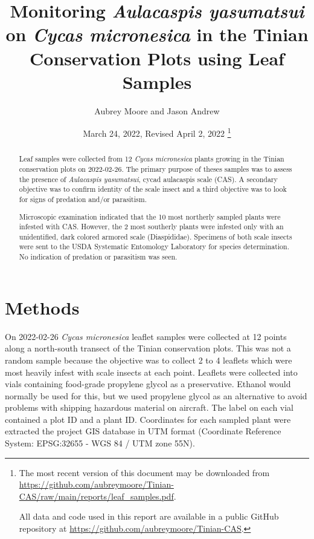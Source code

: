 \documentclass[12pt,letterpaper,english,bibliography=totocnumbered, abstract=on]{scrartcl}
\begin{document}
\titlehead{Technical Report}

\title{Monitoring \textit{Aulacaspis yasumatsui} on \textit{Cycas micronesica} in the Tinian Conservation Plots using Leaf Samples}

\author{Aubrey Moore and Jason Andrew}

\date{
	March 24, 2022, Revised April 2, 2022
	\footnote{
		The most recent version of this document may be downloaded from \url{https://github.com/aubreymoore/Tinian-CAS/raw/main/reports/leaf_samples.pdf}.
		
		All data and code used in this report are available in a public GitHub repository at
		\url{https://github.com/aubreymoore/Tinian-CAS}.
	}
}

\maketitle


\begin{abstract}
Leaf samples were collected from 12 \textit{Cycas micronesica} plants growing in the Tinian conservation plots on 2022-02-26.
The primary purpose of theses samples was to assess the presence of \textit{Aulacaspis yasumatsui}, cycad aulacaspis scale (CAS). A secondary objective was to confirm identity of the scale insect and a third objective was to look for signs of predation and/or parasitism. 

Microscopic examination indicated that the 10 most northerly sampled plants were infested with CAS. However, the 2 most southerly plants were infested only with an unidentified, dark colored armored scale (Diaspididae). Specimens of both scale insects were sent to the USDA Systematic Entomology Laboratory for species determination. No indication of predation or parasitism was seen.  
\end{abstract}



\clearpage
\tableofcontents

\clearpage
\section{Methods}

On 2022-02-26 \textit{Cycas micronesica} leaflet samples were collected at 12 points along a north-south transect of the Tinian conservation plots. This was not a random sample because the objective was to collect 2 to 4 leaflets which were most heavily infest with scale insects at each point. Leaflets were collected into vials containing food-grade propylene glycol as a preservative. Ethanol would normally be used for this, but we used propylene glycol as an alternative to avoid problems with shipping hazardous material on aircraft. The label on each vial contained a plot ID and a plant ID. Coordinates for each sampled plant were extracted the project GIS database in UTM format (Coordinate Reference System: EPSG:32655 - WGS 84 / UTM zone 55N).
\end{document}
